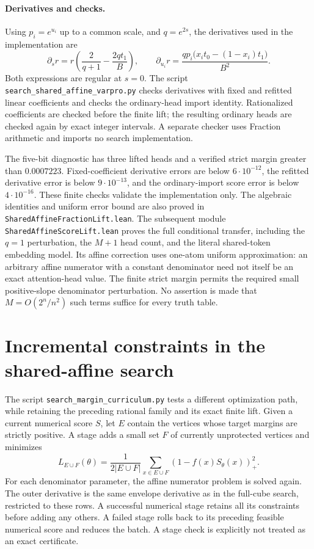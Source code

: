 \documentclass[11pt]{article}
\begin{document}
\paragraph{Derivatives and checks.}
Using $p_i=e^{u_i}$ up to a common scale, and $q=e^{2s}$,
the derivatives used in the implementation are
\[
 \partial_s r=r\left(\frac2{q+1}-\frac{2qt_1}{B}\right),\qquad
 \partial_{u_i}r=
 \frac{qp_i\bigl(x_it_0-(1-x_i)t_1\bigr)}{B^2}.
\]
Both expressions are regular at $s=0$. The script
\texttt{search\_shared\_affine\_varpro.py} checks derivatives with
fixed and refitted linear coefficients and checks the ordinary-head
import identity. Rationalized coefficients are checked before the
finite lift; the resulting ordinary heads are checked again by exact
integer intervals. A separate checker uses Fraction arithmetic and
imports no search implementation.

The five-bit diagnostic has three lifted heads and a verified strict
margin greater than $0.0007223$. Fixed-coefficient derivative errors
are below $6\cdot10^{-12}$, the refitted derivative error is below
$9\cdot10^{-13}$, and the ordinary-import score error is below
$4\cdot10^{-16}$. These finite checks validate the implementation
only. The algebraic identities and uniform error bound are also
proved in \texttt{SharedAffineFractionLift.lean}. The subsequent
module \texttt{SharedAffineScoreLift.lean} proves the full conditional
transfer, including the $q=1$ perturbation, the $M+1$ head count, and
the literal shared-token embedding model. Its affine correction uses
one-atom uniform approximation: an arbitrary affine numerator with a
constant denominator need not itself be an exact attention-head value.
The finite strict margin permits the required small positive-slope
denominator perturbation. No assertion is made that $M=O(2^n/n^2)$
such terms suffice for every truth table.

\section{Incremental constraints in the shared-affine search}

The script \texttt{search\_margin\_curriculum.py} tests a different
optimization path, while retaining the preceding rational family and its
exact finite lift. Given a current numerical score $S$, let $E$ contain
the vertices whose target margins are strictly positive. A stage adds a
small set $F$ of currently unprotected vertices and minimizes
\[
 L_{E\cup F}(\theta)=\frac{1}{2|E\cup F|}
       \sum_{x\in E\cup F}(1-f(x)S_\theta(x))_+^2.
\]
For each denominator parameter, the affine numerator problem is solved
again. The outer derivative is the same envelope derivative as in the
full-cube search, restricted to these rows. A successful numerical stage
retains all its constraints before adding any others. A failed stage
rolls back to its preceding feasible numerical score and reduces the
batch. A stage check is explicitly not treated as an exact certificate.
\end{document}
